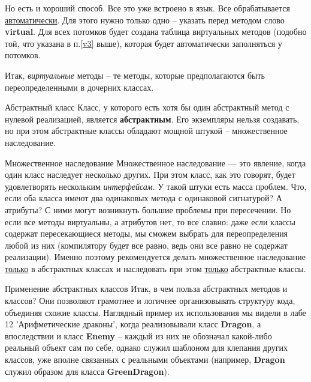 \begin{lecture}[\lectureSubject]
\begin{lecSection}
\begin{lecSection}
			Но есть и  хороший способ. Все это уже встроено в язык. Все обрабатывается \underline{автоматически}. Для этого нужно только одно -- указать перед методом слово \textbf{virtual}. Для всех потомков будет создана таблица виртуальных методов (подобно той, что указана в п.\ref{v3} выше), которая будет автоматически заполняться у потомков.
			
			Итак, \textit{виртуальные} методы -- те методы, которые предполагаются быть переопределенными в дочерних классах.
		\end{lecSection}
		
		\begin{lecSection}
			\begin{lecSubsection}{Абстрактный класс}
				Класс, у которого есть хотя бы один абстрактный метод с нулевой реализацией, является \textbf{абстрактным}. Его экземпляры нельзя создавать, но при этом абстрактные классы обладают мощной штукой -- множественное наследование.
			\end{lecSubsection}
			\begin{lecSubsection}{Множественное наследование}
				Множественное наследование --- это явление, когда один класс наследует несколько других. При этом класс, как это говорят, будет удовлетворять нескольким \textit{интерфейсам}. У такой штуки есть масса проблем. Что, если оба класса имеют два одинаковых метода с одинаковой сигнатурой? А атрибуты? С ними могут возникнуть большие проблемы при пересечении. Но если все методы виртуальны, а атрибутов нет, то все славно: даже если классы содержат пересекающиеся методы, мы сможем выбрать для переопределения любой из них (компилятору будет все равно, ведь они все равно не содержат реализации). Именно поэтому рекомендуется делать множественное наследование \underline{только} в абстрактных классах и наследовать при этом \underline{только} абстрактные классы.
			\end{lecSubsection}
			
			\begin{lecSubsection}{Применение абстрактных классов}
				Итак, в чем польза абстрактных методов и классов? Они позволяют грамотнее и логичнее организовывать структуру кода, объединяя схожие классы. Наглядный пример их использования мы видели в лабе 12 'Арифметические драконы', когда реализовывали класс \textbf{Dragon}, а впоследствии и класс \textbf{Enemy} -- каждый из них не обозначал какой-либо реальный объект сам по себе, однако служил шаблоном для клепания других классов, уже вполне связанных с реальными объектами (например, \textbf{Dragon} служил образом для класса \textbf{GreenDragon}).
			\end{lecSubsection}
		\end{lecSection}
	\end{lecSection}
\end{lecture}

